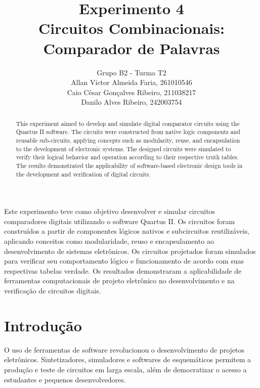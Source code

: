 \documentclass[12pt]{article}
\title{Experimento 4\\ 
Circuitos Combinacionais: Comparador de Palavras}
\author{Grupo B2 - Turma T2\\   
        Allan Victor Almeida Faria, 261010546\\
        Caio César Gonçalves Ribeiro,  211038217\\
        Danilo Alves Ribeiro,  242003754\\
}
\begin{document}
 
\maketitle


\begin{abstract}

This experiment aimed to develop and simulate digital comparator circuits using the Quartus II software. The circuits were constructed from native logic components and reusable sub-circuits, applying concepts such as modularity, reuse, and encapsulation to the development of electronic systems. The designed circuits were simulated to verify their logical behavior and operation according to their respective truth tables. The results demonstrated the applicability of software-based electronic design tools in the development and verification of digital circuits.

\end{abstract}


\begin{resumo}

Este experimento teve como objetivo desenvolver e simular circuitos comparadores digitais utilizando o software Quartus II. Os circuitos foram construídos a partir de componentes lógicos nativos e subcircuitos reutilizáveis, aplicando conceitos como modularidade, reuso e encapsulamento ao desenvolvimento de sistemas eletrônicos. Os circuitos projetados foram simulados para verificar seu comportamento lógico e funcionamento de acordo com suas respectivas tabelas verdade. Os resultados demonstraram a aplicabilidade de ferramentas computacionais de projeto eletrônico no desenvolvimento e na verificação de circuitos digitais.

\end{resumo}



\section{Introdução}
\label{sec:Introducao}

O uso de ferramentas de software revolucionou
o desenvolvimento de projetos eletrônicos. Sintetizadores, simuladores
e softwares de esquemáticos permitem a produção e teste de circuitos
em larga escala, além de democratizar o acesso a estudantes e pequenos 
desenvolvedores.
\end{document}
